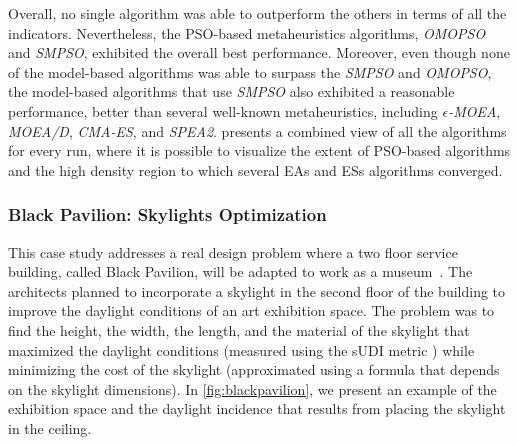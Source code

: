 Overall, no single algorithm was able to outperform the others in terms of all the indicators. Nevertheless, the \ac{PSO}-based metaheuristics algorithms, \textit{OMOPSO} and \textit{SMPSO}, exhibited the overall best performance. Moreover, even though none of the model-based algorithms was able to surpass the \textit{SMPSO} and \textit{OMOPSO}, the model-based algorithms that use \textit{SMPSO} also exhibited a reasonable performance, better than several well-known metaheuristics, including $\epsilon$\textit{-MOEA}, \textit{MOEA/D}, \textit{CMA-ES}, and \textit{SPEA2}.  presents a combined view of all the algorithms for every run, where it is possible to visualize the extent of \ac{PSO}-based algorithms and the high density region to which several \acp{EA} and \acp{ES} algorithms converged.

\subsubsection{Black Pavilion: Skylights Optimization}
This case study addresses a real design problem where a two floor service building, called Black Pavilion, will be adapted to work as a museum~\cite{Caetano2018,IP2019MOO}. The architects planned to incorporate a skylight in the second floor of the building to improve the daylight conditions of an art exhibition space. The problem was to find the height, the width, the length, and the material of the skylight that maximized the daylight conditions (measured using the \ac{sUDI} metric \cite{Nabil2006}) while minimizing the cost of the skylight (approximated using a formula that depends on the skylight dimensions). In \cref{fig:blackpavilion}, we present an example of the exhibition space and the daylight incidence that results from placing the skylight in the ceiling.

